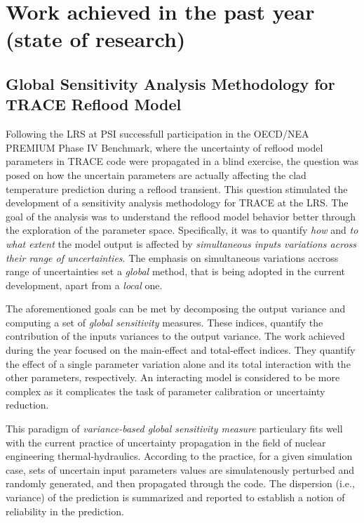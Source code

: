 \documentclass[11pt,titlepage]{article}
\begin{document}
\section{Work achieved in the past year (state of research)}

\subsection{Global Sensitivity Analysis Methodology for TRACE Reflood Model}

Following the LRS at PSI successfull participation in the OECD/NEA PREMIUM Phase IV Benchmark, where the uncertainty of reflood model parameters in TRACE code were propagated in a blind exercise, the question was posed on how the uncertain parameters are actually affecting the clad temperature prediction during a reflood transient.
This question stimulated the development of a sensitivity analysis methodology for TRACE at the LRS.
The goal of the analysis was to understand the reflood model behavior better through the exploration of the parameter space.
Specifically, it was to quantify \emph{how} and \emph{to what extent} the model output is affected by \emph{simultaneous inputs variations across their range of uncertainties}.
The emphasis on simultaneous variations accross range of uncertainties set a \emph{global} method, that is being adopted in the current development, apart from a \emph{local} one.

The aforementioned goals can be met by decomposing the output variance and computing a set of \emph{global sensitivity} measures. 
These indices, quantify the contribution of the inputs variances to the output variance.
The work achieved during the year focused on the main-effect and total-effect indices.
They quantify the effect of a single parameter variation alone and its total interaction with the other parameters, respectively.
An interacting model is considered to be more complex as it complicates the task of parameter calibration or uncertainty reduction.

This paradigm of \textit{variance-based global sensitivity measure} particulary fits well with the current practice of uncertainty propagation in the field of nuclear engineering thermal-hydraulics.
According to the practice, for a given simulation case, sets of uncertain input parameters values are simulatenously perturbed and randomly generated, and then propagated through the code.
The dispersion (i.e., variance) of the prediction is summarized and reported to establish a notion of reliability in the prediction.
\end{document}
